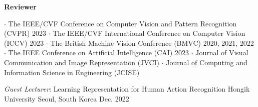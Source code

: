 



\textbf{Reviewer}
\begin{cvskills}
\cvskill
{} %
{\hspace{-3em} \textbf{$\cdot$} The IEEE/CVF Conference on Computer Vision and Pattern Recognition (CVPR) 2023}
\cvskill
{} %
{\hspace{-3em} \textbf{$\cdot$} The IEEE/CVF International Conference on Computer Vision (ICCV) 2023}
\cvskill
{} %
{\hspace{-3em} \textbf{$\cdot$} The British Machine Vision Conference (BMVC) 2020, 2021, 2022}
\cvskill
{} %
{\hspace{-3em} \textbf{$\cdot$} The IEEE Conference on Artificial Intelligence (CAI) 2023}
\cvskill
{} %
{\hspace{-3em} \textbf{$\cdot$} Journal of Visual Communication and Image Representation (JVCI)}
\cvskill
{}
{\hspace{-3em} \textbf{$\cdot$} Journal of Computing and Information Science in Engineering (JCISE)}

\end{cvskills}


\vspace{.5em}

\cventry
{\textit{Guest Lecturer}: Learning Representation for Human Action Recognition}
{Hongik University}
{Seoul, South Korea}
{Dec. 2022}
{}
